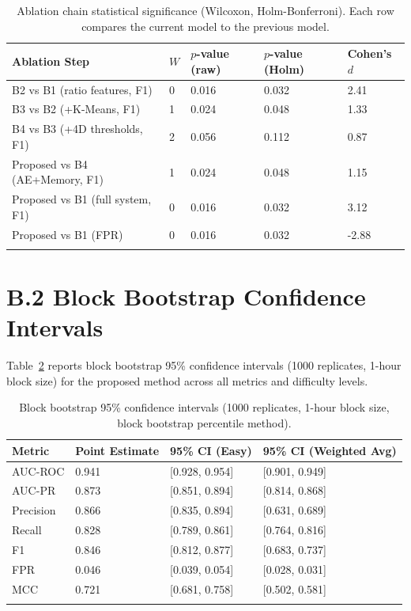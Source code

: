 \begin{longtable}{|m{4.5cm}|m{1.5cm}|m{2.5cm}|m{2cm}|m{2.5cm}|}
\hline
\textbf{Ablation Step} & \textbf{$W$} & \textbf{$p$-value (raw)} & \textbf{$p$-value (Holm)} & \textbf{Cohen's $d$} \\ \hline
B2 vs B1 (ratio features, F1) & 0 & 0.016 & 0.032 & 2.41 \\ \hline
B3 vs B2 (+K-Means, F1) & 1 & 0.024 & 0.048 & 1.33 \\ \hline
B4 vs B3 (+4D thresholds, F1) & 2 & 0.056 & 0.112 & 0.87 \\ \hline
Proposed vs B4 (AE+Memory, F1) & 1 & 0.024 & 0.048 & 1.15 \\ \hline
Proposed vs B1 (full system, F1) & 0 & 0.016 & 0.032 & 3.12 \\ \hline
Proposed vs B1 (FPR) & 0 & 0.016 & 0.032 & -2.88 \\ \hline
\caption{Ablation chain statistical significance (Wilcoxon, Holm-Bonferroni). Each row compares the current model to the previous model.}
\label{tab:wilcoxon_ablation}
\end{longtable}

\section*{B.2 Block Bootstrap Confidence Intervals}

Table~\ref{tab:bootstrap_ci} reports block bootstrap 95\% confidence intervals (1000 replicates, 1-hour block size) for the proposed method across all metrics and difficulty levels.

\begin{longtable}{|m{3.5cm}|m{2cm}|m{3.5cm}|m{2.5cm}|}
\hline
\textbf{Metric} & \textbf{Point Estimate} & \textbf{95\% CI (Easy)} & \textbf{95\% CI (Weighted Avg)} \\ \hline
AUC-ROC & 0.941 & [0.928, 0.954] & [0.901, 0.949] \\ \hline
AUC-PR & 0.873 & [0.851, 0.894] & [0.814, 0.868] \\ \hline
Precision & 0.866 & [0.835, 0.894] & [0.631, 0.689] \\ \hline
Recall & 0.828 & [0.789, 0.861] & [0.764, 0.816] \\ \hline
F1 & 0.846 & [0.812, 0.877] & [0.683, 0.737] \\ \hline
FPR & 0.046 & [0.039, 0.054] & [0.028, 0.031] \\ \hline
MCC & 0.721 & [0.681, 0.758] & [0.502, 0.581] \\ \hline
\caption{Block bootstrap 95\% confidence intervals (1000 replicates, 1-hour block size, block bootstrap percentile method).}
\label{tab:bootstrap_ci}
\end{longtable}

